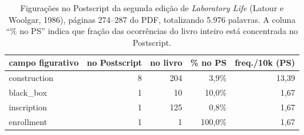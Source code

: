 
\begin{table}[ht]
\centering
\caption[Figurações no Postscript da 2ª edição de \emph{Laboratory Life}]{Figurações no Postscript da segunda edição de \emph{Laboratory Life} (Latour e Woolgar, 1986), páginas 274--287 do PDF, totalizando 5.976 palavras. A coluna ``\% no PS'' indica que fração das ocorrências do livro inteiro está concentrada no Postscript.}
\label{tab:postscript-1986}
\begin{tabular}{lrrrr}
\toprule
campo figurativo & no Postscript & no livro & \% no PS & freq./10k (PS) \\
\midrule
construction & 8 & 204 & 3{,}9\% & 13{,}39 \\
black\_box & 1 & 10 & 10{,}0\% & 1{,}67 \\
inscription & 1 & 125 & 0{,}8\% & 1{,}67 \\
enrollment & 1 & 1 & 100{,}0\% & 1{,}67 \\
\bottomrule
\end{tabular}
\end{table}
